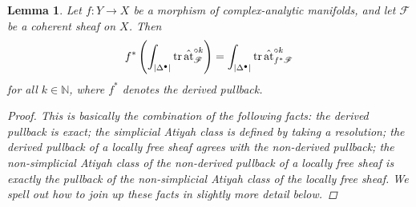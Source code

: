 \documentclass[11pt,fleqn]{article}
\theoremstyle{plain}
\newtheorem{lemma}[theorem]{Lemma}
\theoremstyle{definition}
\theoremstyle{remark}
\numberwithin{equation}{theorem}
\newcommand{\at}{\mathrm{at}}
\newcommand{\simpexpat}[1]{\hat{\at}^{\circ#1}}
\begin{document}
        \begin{lemma}\label{lemma:functorial-under-pullbacks}
            Let $f\colon Y\to X$ be a morphism of complex-analytic manifolds, and let $\mathscr{F}$ be a coherent sheaf on $X$.
            Then
            \begin{equation*}
                f^*\left(
                    \int_{|\Delta^\bullet|} \tr \simpexpat{k}_{\mathscr{F}}
                \right)
                =
                \int_{|\Delta^\bullet|} \tr \simpexpat{k}_{f^*\mathscr{F}}
            \end{equation*}
            for all $k\in\mathbb{N}$, where $f^*$ denotes the \emph{derived} pullback.
            \begin{proof}
                This is basically the combination of the following facts: the derived pullback is exact; the simplicial Atiyah class is defined by taking a resolution; the derived pullback of a locally free sheaf agrees with the non-derived pullback; the non-simplicial Atiyah class of the non-derived pullback of a locally free sheaf is exactly the pullback of the non-simplicial Atiyah class of the locally free sheaf.
                We spell out how to join up these facts in slightly more detail below.


\end{proof}
\end{lemma}
\end{document}
